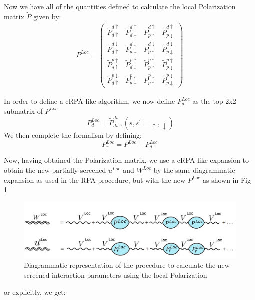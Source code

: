 \documentclass[10pt]{ruthesis}
\begin{document}
{Now we have all of the quantities defined to calculate the local Polarization matrix $\tilde{P}$ given by:
\begin{eqnarray}
 P^{Loc}=
\left(
\begin{array}{cccc}
\tilde P^{d\uparrow}_{d\uparrow}&\tilde P^{d\uparrow}_{d\downarrow}&\tilde P^{d\uparrow}_{p\uparrow}&\tilde P^{d\uparrow}_{p\downarrow}\\
\tilde P^{d\downarrow}_{d\uparrow}&\tilde P^{d\downarrow}_{d\downarrow}&\tilde P^{d\downarrow}_{p\uparrow}&\tilde P^{d\downarrow}_{p\downarrow}\\
\tilde P^{p\uparrow}_{d\uparrow}&\tilde P^{p\uparrow}_{d\downarrow}&\tilde P^{p\uparrow}_{p\uparrow}&\tilde P^{p\uparrow}_{p\downarrow}\\
\tilde P^{p\downarrow}_{d\uparrow}&\tilde P^{p\downarrow}_{d\downarrow}&\tilde P^{p\downarrow}_{p\uparrow}&\tilde P^{p\downarrow}_{p\downarrow}
\end{array}
\right)
\end{eqnarray}

 In order to define a cRPA-like algorithm, we now define  $P^{Loc}_d$ as the top 2x2 submatrix of $P^{Loc}$ 
\begin{equation}
 \ P^{Loc}_d= \tilde P^{ds}_{ds^\prime},(s,s^\prime={\uparrow,\downarrow})
 \end{equation}
 We then complete the formalism by defining:
 \begin{equation}
P^{Loc}_r= P^{Loc}- P^{Loc}_d
 \end{equation}
 
 Now, having obtained the Polarization matrix, we use a cRPA like expansion to obtain the new partially screened $u^{Loc}$ and $W^{Loc}$ by the same diagrammatic expansion as used in the RPA procedure, but with the new $P^{Loc}$ as shown in Fig \ref{W_loc_fig}
 
\begin{figure}[H]
\begin{center}
\includegraphics[width=0.85\columnwidth]{W_loc_rpa.jpg}
\caption{Diagrammatic representation of the procedure to calculate the new screened interaction parameters using the local Polarization \label{W_loc_fig}}
\end{center}
\end{figure} 
or explicitly, we get: 

}
\end{document}
